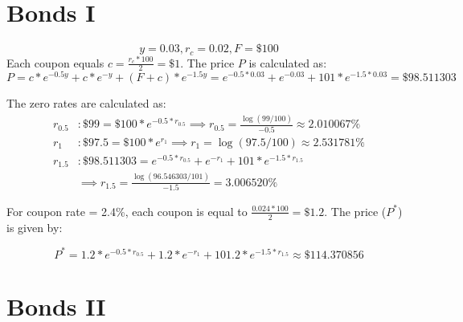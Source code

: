 \documentclass{article}
\begin{document}
\begin{table}[H]
	\begin{center}
\end{center}
\end{table}

\section{Bonds I}

$$ y=0.03, r_c = 0.02, F=\$100$$
Each coupon equals $c = \frac{r_c * 100}{2} = \$1$. The price $P$ is calculated as:
$$P = c * e^{-0.5y} + c * e^{-y} + (F+c) * e^{-1.5y} = e^{-0.5*0.03} + e^{-0.03} + 101 * e^{-1.5*0.03} = \$98.511303$$

The zero rates are calculated as:
\begin{align*}
	r_{0.5} &: \$99 = \$100*e^{-0.5*r_{0.5}} \implies r_{0.5} = \frac{\log\left(99/100\right)}{-0.5} \approx 2.010067\%\\
	r_{1} &: \$97.5 = \$100*e^{r_{1}} \implies r_{1} = \log\left(97.5/100\right) \approx 2.531781 \% \\
	r_{1.5} &: \$98.511303 = e^{-0.5 * r_{0.5}} + e^{-r_1} + 101*e^{-1.5*r_{1.5}} \\
	& \implies r_{1.5} = \frac{ \log\left( 96.546303 / 101 \right)}{-1.5} = 3.006520 \%
\end{align*}

For coupon rate = 2.4\%, each coupon is equal to $\frac{0.024 * 100}{2} = \$1.2$. The price ($P^*$) is given by:

$$P^* = 1.2 * e^{-0.5*r_{0.5}} + 1.2 * e^{-r_1} + 101.2 * e^{-1.5*r_{1.5}} \approx \$114.370856 $$


\section{Bonds II}
\end{document}
